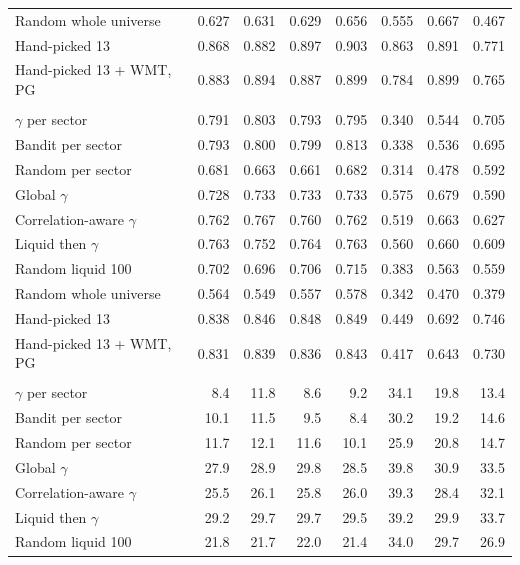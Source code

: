 \begin{table}[H]
\begin{tabular}{l*{7}{r}}
Random whole universe & 0.627 & 0.631 & 0.629 & 0.656 & 0.555 & 0.667 & 0.467 \\
\addlinespace[2pt]
Hand-picked 13 & 0.868 & 0.882 & 0.897 & 0.903 & 0.863 & 0.891 & 0.771 \\
Hand-picked 13 + WMT, PG & 0.883 & 0.894 & 0.887 & 0.899 & 0.784 & 0.899 & 0.765 \\
\addlinespace
\multicolumn{8}{l}{\emph{Hedge on, mean portfolio $\beta$}} \\
$\gamma$ per sector & 0.791 & 0.803 & 0.793 & 0.795 & 0.340 & 0.544 & 0.705 \\
Bandit per sector & 0.793 & 0.800 & 0.799 & 0.813 & 0.338 & 0.536 & 0.695 \\
Random per sector & 0.681 & 0.663 & 0.661 & 0.682 & 0.314 & 0.478 & 0.592 \\
\addlinespace[2pt]
Global $\gamma$ & 0.728 & 0.733 & 0.733 & 0.733 & 0.575 & 0.679 & 0.590 \\
Correlation-aware $\gamma$ & 0.762 & 0.767 & 0.760 & 0.762 & 0.519 & 0.663 & 0.627 \\
Liquid then $\gamma$ & 0.763 & 0.752 & 0.764 & 0.763 & 0.560 & 0.660 & 0.609 \\
Random liquid 100 & 0.702 & 0.696 & 0.706 & 0.715 & 0.383 & 0.563 & 0.559 \\
Random whole universe & 0.564 & 0.549 & 0.557 & 0.578 & 0.342 & 0.470 & 0.379 \\
\addlinespace[2pt]
Hand-picked 13 & 0.838 & 0.846 & 0.848 & 0.849 & 0.449 & 0.692 & 0.746 \\
Hand-picked 13 + WMT, PG & 0.831 & 0.839 & 0.836 & 0.843 & 0.417 & 0.643 & 0.730 \\
\addlinespace
\multicolumn{8}{l}{\emph{Hedge on, hedge-pool weight (\% of wealth)}} \\
$\gamma$ per sector & 8.4 & 11.8 & 8.6 & 9.2 & 34.1 & 19.8 & 13.4 \\
Bandit per sector & 10.1 & 11.5 & 9.5 & 8.4 & 30.2 & 19.2 & 14.6 \\
Random per sector & 11.7 & 12.1 & 11.6 & 10.1 & 25.9 & 20.8 & 14.7 \\
\addlinespace[2pt]
Global $\gamma$ & 27.9 & 28.9 & 29.8 & 28.5 & 39.8 & 30.9 & 33.5 \\
Correlation-aware $\gamma$ & 25.5 & 26.1 & 25.8 & 26.0 & 39.3 & 28.4 & 32.1 \\
Liquid then $\gamma$ & 29.2 & 29.7 & 29.7 & 29.5 & 39.2 & 29.9 & 33.7 \\
Random liquid 100 & 21.8 & 21.7 & 22.0 & 21.4 & 34.0 & 29.7 & 26.9 \\

\end{tabular}
\end{table}
